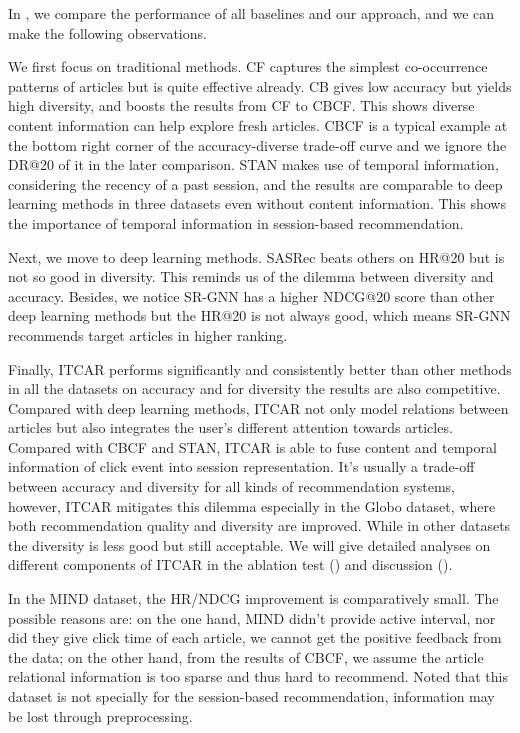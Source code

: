 
In , we compare the performance of all baselines and our
approach, and we can make the following observations.

We first focus on traditional methods. CF captures the simplest co-occurrence patterns of articles but is quite effective already. CB gives low accuracy but yields high 
diversity, and boosts the results from CF to CBCF. This shows diverse content information can help explore fresh articles. CBCF is a typical example at the bottom right corner of the accuracy-diverse trade-off curve and we ignore the DR@20 of it in the later comparison. STAN makes use of temporal information, considering the recency of a past session, and the results are comparable to deep learning methods in three datasets even without content information. This shows the importance of temporal information in session-based recommendation. 

Next, we move to deep learning methods. SASRec beats others on HR@20 but is not so good in diversity. This reminds us of the dilemma between diversity and accuracy. Besides, we notice SR-GNN has a higher NDCG@20 score than other deep learning methods but the HR@20 is not always good, which means SR-GNN recommends target articles in higher ranking.

Finally, ITCAR performs significantly and consistently better than other methods in all the datasets on accuracy and for diversity the results are also competitive. 
Compared with deep learning methods, ITCAR not only model relations between articles but also integrates the user's different attention towards articles. Compared with CBCF and STAN, ITCAR is able to fuse content and temporal information of click event into session representation. It's usually a trade-off between accuracy and diversity for all kinds of recommendation systems, however, ITCAR mitigates this dilemma especially in the Globo dataset, where both recommendation quality and diversity are improved. While in other datasets the diversity is less good but still acceptable. We will give detailed analyses on different components of ITCAR in the ablation test () and discussion ().

In the MIND dataset, the HR/NDCG improvement is comparatively small. 
The possible reasons are: 
on the one hand, MIND didn't provide active interval, nor did they give click time of each article, we cannot get the positive feedback from the data; on the other hand, from the results of CBCF, we assume the article relational information is too sparse and thus hard to recommend. Noted that this dataset is not specially for the session-based recommendation, information may be lost through preprocessing.


